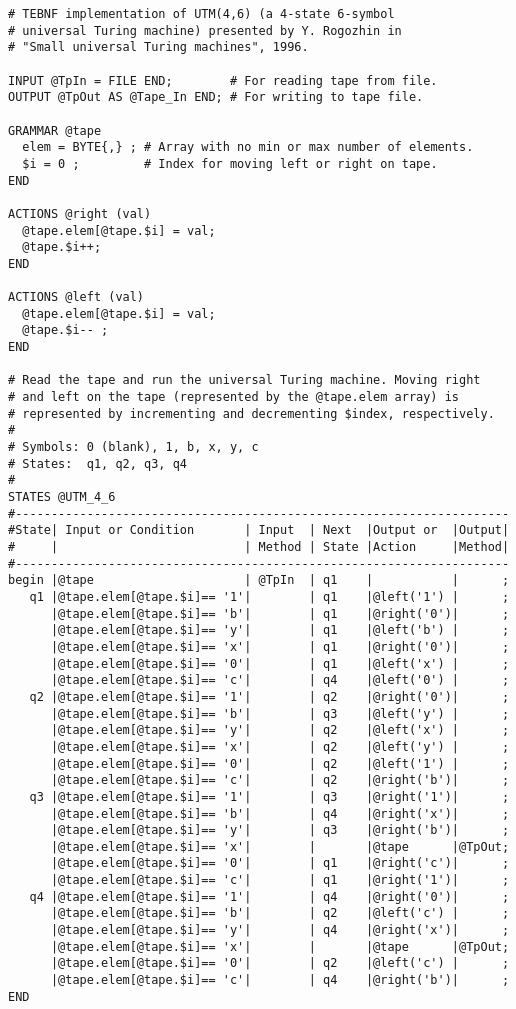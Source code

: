 \begin{lstlisting}[basicstyle=\small,caption={Rogozhin's UTM(4,6) implemented in TEBNF.},label=ExampleUTM46]
# TEBNF implementation of UTM(4,6) (a 4-state 6-symbol
# universal Turing machine) presented by Y. Rogozhin in
# "Small universal Turing machines", 1996.

INPUT @TpIn = FILE END;        # For reading tape from file.
OUTPUT @TpOut AS @Tape_In END; # For writing to tape file.

GRAMMAR @tape
  elem = BYTE{,} ; # Array with no min or max number of elements.
  $i = 0 ;         # Index for moving left or right on tape.
END

ACTIONS @right (val)
  @tape.elem[@tape.$i] = val;
  @tape.$i++;
END

ACTIONS @left (val)
  @tape.elem[@tape.$i] = val;
  @tape.$i-- ;
END

# Read the tape and run the universal Turing machine. Moving right
# and left on the tape (represented by the @tape.elem array) is
# represented by incrementing and decrementing $index, respectively.
#
# Symbols: 0 (blank), 1, b, x, y, c
# States:  q1, q2, q3, q4
#
STATES @UTM_4_6
#---------------------------------------------------------------------
#State| Input or Condition       | Input  | Next  |Output or  |Output|
#     |                          | Method | State |Action     |Method|
#---------------------------------------------------------------------
begin |@tape                     | @TpIn  | q1    |           |      ;
   q1 |@tape.elem[@tape.$i]== '1'|        | q1    |@left('1') |      ;
      |@tape.elem[@tape.$i]== 'b'|        | q1    |@right('0')|      ;
      |@tape.elem[@tape.$i]== 'y'|        | q1    |@left('b') |      ;
      |@tape.elem[@tape.$i]== 'x'|        | q1    |@right('0')|      ;
      |@tape.elem[@tape.$i]== '0'|        | q1    |@left('x') |      ;
      |@tape.elem[@tape.$i]== 'c'|        | q4    |@left('0') |      ;
   q2 |@tape.elem[@tape.$i]== '1'|        | q2    |@right('0')|      ;
      |@tape.elem[@tape.$i]== 'b'|        | q3    |@left('y') |      ;
      |@tape.elem[@tape.$i]== 'y'|        | q2    |@left('x') |      ;
      |@tape.elem[@tape.$i]== 'x'|        | q2    |@left('y') |      ;
      |@tape.elem[@tape.$i]== '0'|        | q2    |@left('1') |      ;
      |@tape.elem[@tape.$i]== 'c'|        | q2    |@right('b')|      ;
   q3 |@tape.elem[@tape.$i]== '1'|        | q3    |@right('1')|      ;
      |@tape.elem[@tape.$i]== 'b'|        | q4    |@right('x')|      ;
      |@tape.elem[@tape.$i]== 'y'|        | q3    |@right('b')|      ;
      |@tape.elem[@tape.$i]== 'x'|        |       |@tape      |@TpOut;
      |@tape.elem[@tape.$i]== '0'|        | q1    |@right('c')|      ;
      |@tape.elem[@tape.$i]== 'c'|        | q1    |@right('1')|      ;
   q4 |@tape.elem[@tape.$i]== '1'|        | q4    |@right('0')|      ;
      |@tape.elem[@tape.$i]== 'b'|        | q2    |@left('c') |      ;
      |@tape.elem[@tape.$i]== 'y'|        | q4    |@right('x')|      ;
      |@tape.elem[@tape.$i]== 'x'|        |       |@tape      |@TpOut;
      |@tape.elem[@tape.$i]== '0'|        | q2    |@left('c') |      ;
      |@tape.elem[@tape.$i]== 'c'|        | q4    |@right('b')|      ;
END
\end{lstlisting}


